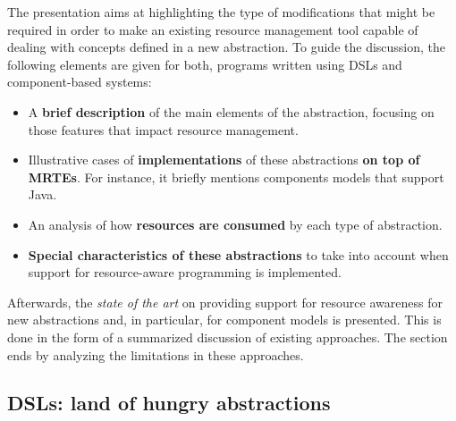 The presentation aims at highlighting the type of modifications that might be required in order to make an existing resource management tool capable of dealing with concepts defined in a new abstraction.
To guide the discussion, the following elements are given for both, programs written using DSLs and component-based systems:
\begin{itemize}
\item A \textbf{brief description} of the main elements of the abstraction, focusing on those features that impact resource management. 

\item Illustrative cases of \textbf{implementations} of these abstractions \textbf{on top of MRTEs}.
For instance, it briefly mentions components models that support Java.

\item An analysis of how \textbf{resources are consumed} by each type of abstraction.

\item \textbf{Special characteristics of these abstractions} to take into account when support for resource-aware programming is implemented.     


\end{itemize}

Afterwards, the \textit{state of the art} on providing support for resource awareness for new abstractions and, in particular, for component models is presented.
This is done in the form of a summarized discussion of existing approaches. 
The section ends by analyzing the limitations in these approaches. 


\subsection{DSLs: land of hungry abstractions} \label{sec:DSL-on-MRTEs}


